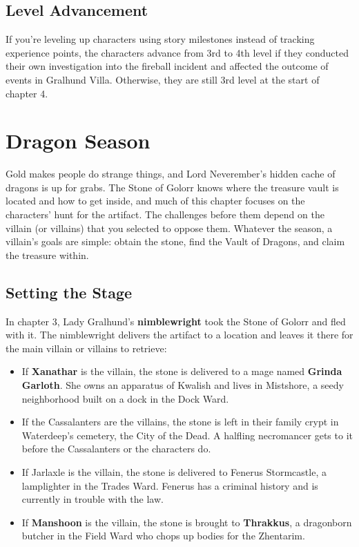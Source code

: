 \documentclass[10pt,a4paper,twoside,twocolumn,openany,nodeprecatedcode]{dndbook}
\begin{document}
\section{Level Advancement}
If you're leveling up characters using story milestones instead of tracking experience points, the characters advance from 3rd to 4th level if they conducted their own investigation into the fireball incident and affected the outcome of events in Gralhund Villa. Otherwise, they are still 3rd level at the start of chapter 4.
\chapter{Dragon Season}
Gold makes people do strange things, and Lord Neverember's hidden cache of dragons is up for grabs. The Stone of Golorr knows where the treasure vault is located and how to get inside, and much of this chapter focuses on the characters' hunt for the artifact. The challenges before them depend on the villain (or villains) that you selected to oppose them. Whatever the season, a villain's goals are simple: obtain the stone, find the Vault of Dragons, and claim the treasure within.
\section{Setting the Stage}
In chapter 3, Lady Gralhund's \textbf{nimblewright} took the Stone of Golorr and fled with it. The nimblewright delivers the artifact to a location and leaves it there for the main villain or villains to retrieve:
\begin{itemize}

\item If \textbf{Xanathar} is the villain, the stone is delivered to a mage named \textbf{Grinda Garloth}. She owns an apparatus of Kwalish and lives in Mistshore, a seedy neighborhood built on a dock in the Dock Ward.
\item If the Cassalanters are the villains, the stone is left in their family crypt in Waterdeep's cemetery, the City of the Dead. A halfling necromancer gets to it before the Cassalanters or the characters do.
\item If Jarlaxle is the villain, the stone is delivered to Fenerus Stormcastle, a lamplighter in the Trades Ward. Fenerus has a criminal history and is currently in trouble with the law.
\item If \textbf{Manshoon} is the villain, the stone is brought to \textbf{Thrakkus}, a dragonborn butcher in the Field Ward who chops up bodies for the Zhentarim.
\end{itemize}
\end{document}
